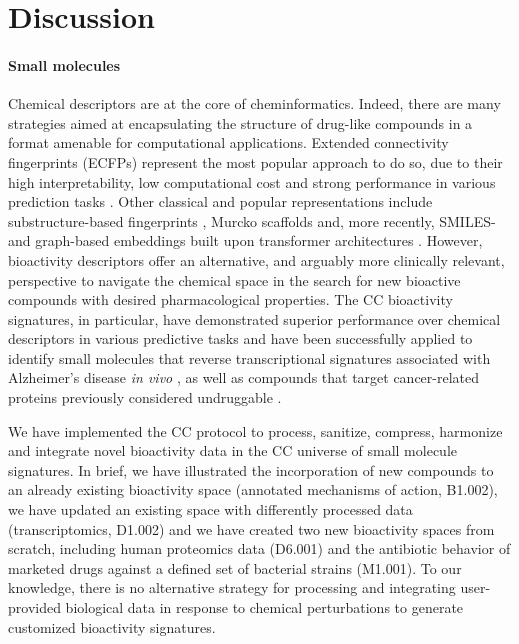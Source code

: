 \chapter{Discussion}
\label{discussion}
\clearpage


\subsubsection{Small molecules}


Chemical descriptors are at the core of cheminformatics. Indeed, there are many strategies aimed at encapsulating the structure of drug-like compounds in a format amenable for computational applications. Extended connectivity fingerprints (ECFPs) represent the most popular approach to do so, due to their high interpretability, low computational cost and strong performance in various prediction tasks \cite{rogers_extended-connectivity_2010}. Other classical and popular representations include substructure-based fingerprints \cite{durant_reoptimization_2002}, Murcko scaffolds \cite{bemis_properties_1996} and, more recently, SMILES- and graph-based embeddings built upon transformer architectures \cite{shin_self-attention_2019, zhou_uni-mol_2022}. However, bioactivity descriptors offer an alternative, and arguably more clinically relevant, perspective to navigate the chemical space in the search for new bioactive compounds with desired pharmacological properties. The CC bioactivity signatures, in particular, have demonstrated superior performance over chemical descriptors in various predictive tasks and have been successfully applied to identify small molecules that reverse transcriptional signatures associated with Alzheimer’s disease \textit{in vivo} \cite{pauls_identification_2021}, as well as compounds that target cancer-related proteins previously considered undruggable \cite{bertoni_bioactivity_2021}.

We have implemented the CC protocol to process, sanitize, compress, harmonize and integrate novel bioactivity data in the CC universe of small molecule signatures. In brief, we have illustrated the incorporation of new compounds to an already existing bioactivity space (annotated mechanisms of action, B1.002), we have updated an existing space with differently processed data (transcriptomics, D1.002) and we have created two new bioactivity spaces from scratch, including human proteomics data (D6.001) and the antibiotic behavior of marketed drugs against a defined set of bacterial strains (M1.001). To our knowledge, there is no alternative strategy for processing and integrating user-provided biological data in response to chemical perturbations to generate customized bioactivity signatures. 


